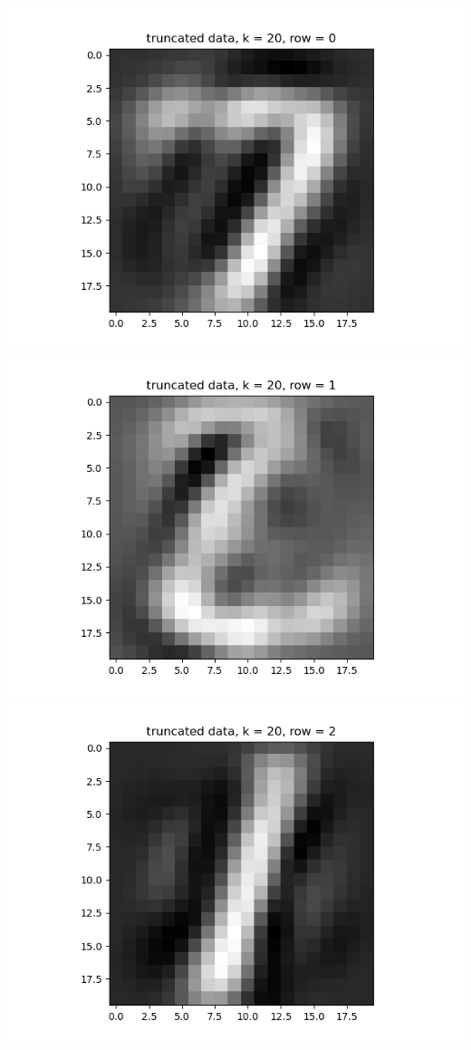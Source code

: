\documentclass{article}
\begin{document}
\begin{enumerate}
\begin{enumerate}
\begin{center}
			\includegraphics[scale=.4]{hw3 trunc, k = 20, row = 0}
			\includegraphics[scale=.4]{hw3 trunc, k = 20, row = 1}
			\includegraphics[scale=.4]{hw3 trunc, k = 20, row = 2}

\end{center}
\end{enumerate}
\end{enumerate}
\end{document}
